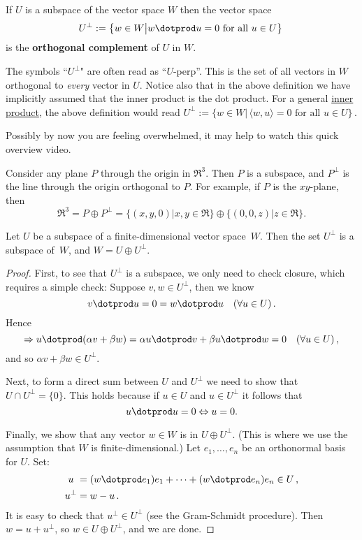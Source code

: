 \begin{definition}
If $U$ is a subspace of the vector space $W$ then the vector space 
\[U^\perp := \big\{w\in W \big| w\dotprod u=0 \text{ for all } u\in U\big\}\, \]
is the {\bfseries orthogonal complement} of $U$ in $W$. 
\end{definition}


\begin{remark}
The symbols ``$U^\perp$" are often read as ``$U$-perp''.  This is the set of all vectors in $W$ orthogonal to \emph{every} vector in $U$. 
Notice also that in the above definition we have implicitly assumed that the inner product is the dot product. For a general \hyperlink{inner_product}{inner product}, the  
above definition would read $U^\perp := \big\{w\in W \big|\,  \langle w,u\rangle=0 \text{~for~all~}u\in U\big\}\, $.
\end{remark}
Possibly by now you are feeling overwhelmed, it may help to watch this quick overview video.




\begin{example}
Consider any plane $P$ through the origin in $\Re^3$.  Then $P$ is a subspace, and $P^\perp$ is the line through the origin orthogonal to $P$.  For example, if $P$ is the $xy$-plane, then
\[
\Re^3=P\oplus P^\perp=\{(x,y,0)| x,y\in \Re \} \oplus \{(0,0,z)| z\in \Re \}.
\]
\end{example}

\begin{theorem}
Let $U$ be a subspace of a finite-dimensional vector space~$W$.  Then the set $U^\perp$ is a subspace of~$W$, and $W=U\oplus U^\perp$.
\end{theorem}

\begin{proof}
First, to see that $U^\perp$ is a subspace, we only need to check closure, which requires a simple check:
Suppose $v,w\in U^\perp$, then we know  \[v\dotprod u = 0 = w\dotprod u \quad (\forall u\in U)\, .\]
Hence
\[\Rightarrow u\dotprod(\alpha v+\beta w)= \alpha u\dotprod v + \beta u\dotprod w =0\quad (\forall u\in U)\, ,\] 
and so $\alpha v+\beta w\in U^\perp$.

Next, to form a direct sum between $U$ and $U^\perp$ we need to show
that $U\cap U^\perp=\{0\}$. This holds because if $u\in U$ and $u\in U^\perp$ it follows that
\[
u\dotprod u = 0 \Leftrightarrow u=0.
\]

Finally, we show that any vector $w\in W$ is in $U\oplus U^\perp$.  (This is where we use the assumption that $W$ is finite-dimensional.)  Let $e_1, \ldots, e_n$ be an orthonormal basis for $U$.  Set: 
\begin{align*}
u\ &=(w\dotprod e_1)e_1 + \cdots + (w\dotprod e_n)e_n \in U\, ,\\
u^\perp&= w-u\, .
\end{align*}
It is easy to check that $u^\perp \in U^\perp$ (see the Gram-Schmidt procedure).  Then $w=u+u^\perp$, so $w\in U\oplus U^\perp$, and we are done.
\end{proof}

